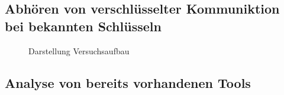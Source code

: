 	\subsection{Abhören von verschlüsselter Kommuniktion bei bekannten Schlüsseln}
	\begin{figure}[H]
		\centering
		\caption{Darstellung Versuchsaufbau}
		\label{fig:versuchsaufbau}
	\end{figure}
	\subsection{Analyse von bereits vorhandenen Tools} %